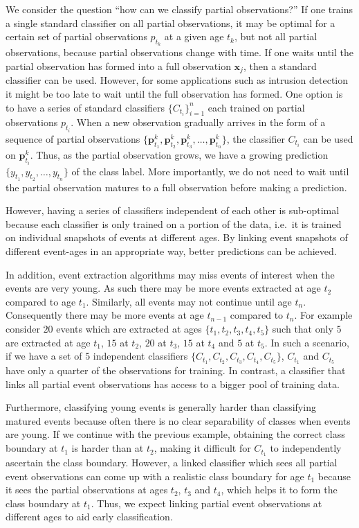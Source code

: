 \documentclass[a4paper,11pt]{article}
\begin{document}
We consider the question ``how can we classify partial observations?'' If one trains a single standard classifier on all partial observations, it may be optimal for a certain set of partial observations $p_{t_k}$ at a given age $t_k$, but not all partial observations, because partial observations change with time. If one waits until the partial observation has formed into a full observation $\bm{x}_j$, then a standard classifier can be used. However, for some applications such as intrusion detection it might be too late to wait until the full observation has formed. One option is to have a series of standard classifiers $\{C_{t_i}\}_{i=1}^n$ each trained on partial observations $p_{t_i}$. When a new observation gradually arrives in the form of a sequence of partial observations $\{\bm{p}^k_{t_1},\bm{p}^k_{t_2}, \bm{p}^k_{t_3}, \dots, \bm{p}^k_{t_n}\}$, the classifier $C_{t_i}$ can be used on $\bm{p}^k_{t_i}$. Thus, as the partial observation grows, we have a growing prediction $\{y_{t_1}, y_{t_2}, \dots, y_{t_n}\}$ of the class label. More importantly, we do not need to wait until the partial observation matures to a full observation before making a prediction.

However, having a series of classifiers independent of each other is sub-optimal because each classifier is only trained on a portion of the data, i.e.\ it is trained on  individual snapshots of events at different ages. By linking event snapshots of different event-ages in an appropriate way,  better predictions can be achieved.

In addition, event extraction algorithms may miss events of interest when the events are very young. As such there may be more events extracted at age $t_2$ compared to age $t_1$. Similarly, all events may not continue  until age $t_n$. Consequently there may be more events at age $t_{n-1}$ compared to $t_n$. For example consider $20$ events which are extracted at ages $\{t_1,t_2,t_3,t_4,t_5\}$ such that only $5$ are extracted at age $t_1$, $15$ at $t_2$, $20$ at $t_3$, $15$ at $t_4$ and $5$ at $t_5$. In such a scenario, if we have a set of $5$ independent classifiers   $\{C_{t_1}, C_{t_2}, C_{t_3}, C_{t_4}, C_{t_5}  \}$, $C_{t_1}$ and $C_{t_5}$ have only a quarter of the observations for training. In contrast, a classifier that links all partial event observations has access to a bigger pool of training data.

Furthermore, classifying young events is generally harder than classifying  matured events because often there is no  clear separability of classes when events are young. If we continue with the previous example, obtaining the correct class boundary at $t_1$ is harder than at $t_2$, making it  difficult for $C_{t_1}$  to independently ascertain the class boundary. However, a linked classifier which sees all partial event observations can come up with a realistic class boundary for age $t_1$ because it sees the partial observations at ages $t_2$, $t_3$ and $t_4$, which helps it to form the class boundary at $t_1$. Thus, we expect linking partial event observations at different ages to aid early classification.
\end{document}
